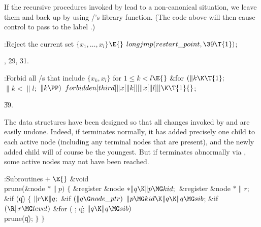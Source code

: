 If the recursive procedures invoked by  lead to a non-canonical
situation, we leave them and back up by using \CEE/'s 
library function. (The code above will then cause control to pass
to the label .)

\Y\B\4:Reject the current set $\{x_1,\ldots,x_l\}$\X${}\E{}$\6
$\\{longjmp}(\\{restart\_point},\39\T{1}){}$;\par
{}, 29, 31.\fi

\B{}:Forbid all \SET/s that include $\{x_k,x_l\}$ for
$1\le k<l$\X${}\E{}$\6
\&{for} ${}(\|k\K\T{1};{}$ ${}\|k<\|l;{}$ ${}\|k\PP){}$\1\5
${}\\{forbidden}[\\{third}[\|x[\|k]][\|x[\|l]]]\K\T{1}{}$;\2\par
\U39.\fi

The data structures have been designed so that all
changes invoked by
 and  are easily undone. Indeed, if 
terminates normally, it has added precisely one child to each active node
(including any terminal nodes that are present), and the newly added child
will of course be the youngest. But if  terminates abnormally
via , some active nodes may not have been reached.

\Y\B\4:Subroutines\X${}\mathrel+\E{}$\6
\&{void} \\{prune}(\&{node} ${}{*}\|p){}$\1\1\2\2\6
${}\{{}$\1\6
\&{register} \&{node} ${}{*}\|q\K\|p\MG\\{kid};{}$\6
\&{register} \&{node} ${}{*}\|r;{}$\7
\&{if} (\|q)\5
${}\{{}$\1\6
${}\|r\K\|q;{}$\6
\&{if} ${}(\|q\G\\{node\_ptr}){}$\1\5
${}\|p\MG\\{kid}\K\|q\K\|q\MG\\{sib}{}$;\2\6
\&{if} ${}(\R\|r\MG\\{level}){}$\1\6
\&{for} ( ; \|q; ${}\|q\K\|q\MG\\{sib}){}$\1\5
\\{prune}(\|q);\2\2\6
\4${}\}{}$\2\6
\4${}\}{}$\2\par
\fi

